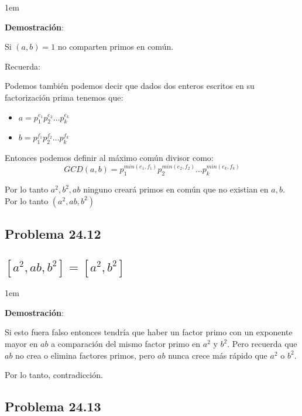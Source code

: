 \documentclass[12pt, fleqn]{article}                             %
\newenvironment{SmallIndentation}[1][0.75em]                    %
    {\begin{adjustwidth}{#1}{}\begin{footnotesize}}                 %
    {\end{footnotesize}\end{adjustwidth}}                           %
\begin{document}
    \begin{SmallIndentation}[1em]
        \textbf{Demostración}:
        
        Si $(a,b)=1$ no comparten primos en común.

        Recuerda:

        Podemos también podemos decir que dados dos enteros escritos en 
        su factorización prima tenemos que:
        \begin{itemize}
            \item $a = p_1^{e_1} p_2^{e_2} \dots p_k^{e_k}$
            \item $b = p_1^{f_1} p_2^{f_2} \dots p_k^{f_k}$
        \end{itemize}

        Entonces podemos definir al máximo común divisor como:
        \begin{equation}
            GCD(a, b) = p_1^{min(e_1, f_1)} p_2^{min(e_2, f_2)} \dots p_k^{min(e_k, f_k)}
        \end{equation}

        Por lo tanto $a^2, b^2, ab$ ninguno creará primos en común
        que no existian en $a, b$. Por lo tanto $(a^2, ab, b^2)$

    \end{SmallIndentation}

    \subsection{Problema 24.12}
    \subsection*{$[a^2, ab, b^2] = [a^2, b^2]$}

    \begin{SmallIndentation}[1em]
        \textbf{Demostración}:
        
        Si esto fuera falso entonces tendría que haber un factor primo con un
        exponente mayor en $ab$ a comparación del mismo factor primo en $a^2$ y
        $b^2$. Pero recuerda que $ab$ no crea o elimina factores primos, pero
        $ab$ nunca crece más rápido que $a^2$ o $b^2$.

        Por lo tanto, contradicción.
    \end{SmallIndentation}


    \subsection{Problema 24.13}
\end{document}

